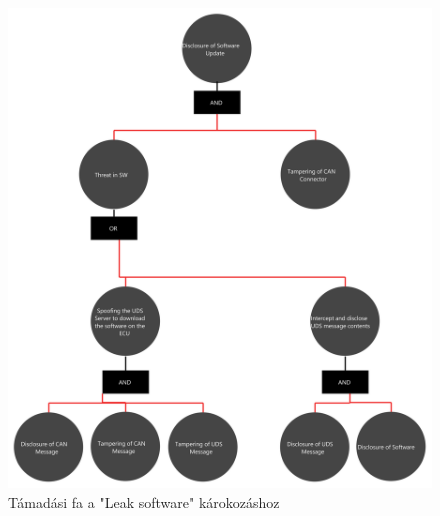 \begin{figure}[!ht]
	\centering
	\includegraphics[width=120mm, keepaspectratio]{figures/AT-SECSW-00.png}
	\caption{Támadási fa a "Leak software" károkozáshoz} 
	\label{fig:ff_leak_sw}
\end{figure}


